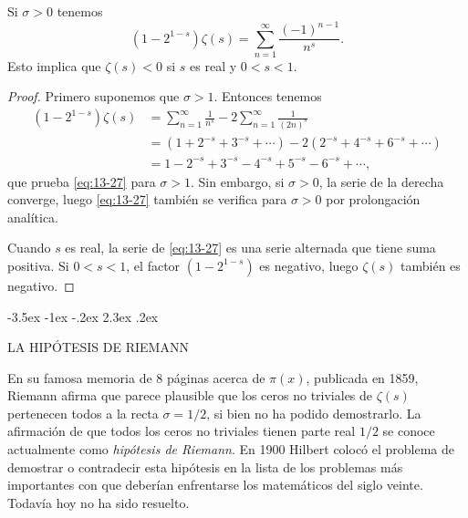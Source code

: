 \documentclass[12pt,a4paper]{book}
\makeatletter
\renewcommand\section{\@startsection{section}{1}{\z@}%
  {-3.5ex \@plus -1ex \@minus -.2ex}%
  {2.3ex \@plus .2ex}%
  {\normalfont\Large\bfseries\raggedright}}
\makeatother
\begin{document}
    \begin{teorema}\label{teo:13-11}
        Si $\sigma>0$ tenemos
        \begin{equation}\label{eq:13-27}
            (1-2^{1-s})\zeta(s)=\sum_{n=1}^{\infty}\frac{(-1)^{n-1}}{n^{s}}.
        \end{equation}
        Esto implica que $\zeta(s)<0$ si $s$ es real y $0<s<1$.
    \end{teorema}

    \begin{proof}
        Primero suponemos que $\sigma>1$. Entonces tenemos
        \begin{align*}
            (1-2^{1-s})\zeta(s)&=\sum_{n=1}^{\infty}\frac{1}{n^{s}}-2\sum_{n=1}^{\infty}\frac{1}{(2n)^{s}}\\
            &=(1+2^{-s}+3^{-s}+\cdots)-2(2^{-s}+4^{-s}+6^{-s}+\cdots)\\
            &=1-2^{-s}+3^{-s}-4^{-s}+5^{-s}-6^{-s}+\cdots,
        \end{align*}
        que prueba \eqref{eq:13-27} para $\sigma>1$. Sin embargo, si $\sigma>0$, la serie de la
        derecha converge, luego \eqref{eq:13-27} también se verifica para $\sigma>0$ por
        prolongación analítica.

        Cuando $s$ es real, la serie de \eqref{eq:13-27} es una serie alternada que tiene suma
        positiva. Si $0<s<1$, el factor $(1-2^{1-s})$ es negativo, luego $\zeta(s)$ también es
        negativo.
    \end{proof}

    \section{LA HIPÓTESIS DE RIEMANN}

    En su famosa memoria de 8 páginas acerca de $\pi(x)$, publicada en 1859, Riemann
    \cite{riemann1859} afirma que parece plausible que los ceros no triviales de $\zeta(s)$
    pertenecen todos a la recta $\sigma=1/2$, si bien no ha podido demostrarlo. La afirmación
    de que todos los ceros no triviales tienen parte real $1/2$ se conoce actualmente como
    \textit{hipótesis de Riemann}. En 1900 Hilbert colocó el problema de demostrar o
    contradecir esta hipótesis en la lista de los problemas más importantes con que deberían
    enfrentarse los matemáticos del siglo veinte. Todavía hoy no ha sido resuelto.
\end{document}
